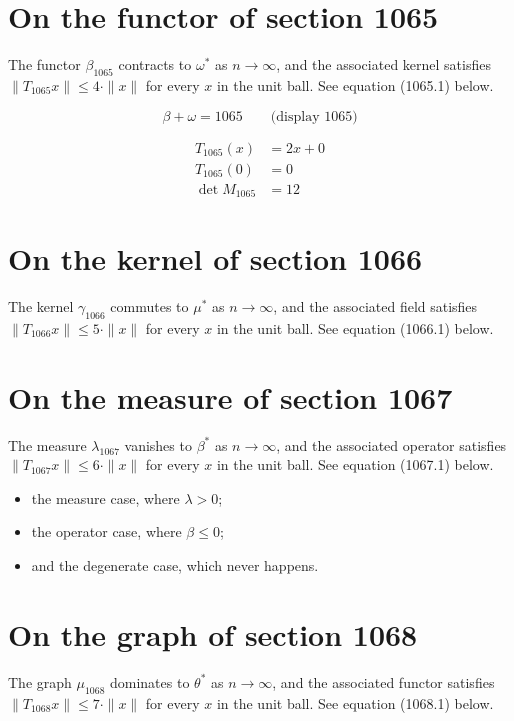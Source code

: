 \documentclass{article}
\begin{document}
\section{On the functor of section 1065}
The functor $\beta_{1065}$ contracts to $\omega^{*}$ as $n \to \infty$,
and the associated kernel satisfies $\|T_{1065} x\| \leq 4 \cdot \|x\|$
for every $x$ in the unit ball. See equation (1065.1) below.

$$
\beta + \omega = 1065 \qquad \text{(display 1065)}
$$

\begin{align}
T_{1065}(x) &= 2 x + 0 \\
T_{1065}(0) &= 0 \\
\det M_{1065} &= 12
\end{align}

\section{On the kernel of section 1066}
The kernel $\gamma_{1066}$ commutes to $\mu^{*}$ as $n \to \infty$,
and the associated field satisfies $\|T_{1066} x\| \leq 5 \cdot \|x\|$
for every $x$ in the unit ball. See equation (1066.1) below.

\section{On the measure of section 1067}
The measure $\lambda_{1067}$ vanishes to $\beta^{*}$ as $n \to \infty$,
and the associated operator satisfies $\|T_{1067} x\| \leq 6 \cdot \|x\|$
for every $x$ in the unit ball. See equation (1067.1) below.

\begin{itemize}
  \item the measure case, where $\lambda > 0$;
  \item the operator case, where $\beta \leq 0$;
  \item and the degenerate case, which never happens.
\end{itemize}

\section{On the graph of section 1068}
The graph $\mu_{1068}$ dominates to $\theta^{*}$ as $n \to \infty$,
and the associated functor satisfies $\|T_{1068} x\| \leq 7 \cdot \|x\|$
for every $x$ in the unit ball. See equation (1068.1) below.
\end{document}
